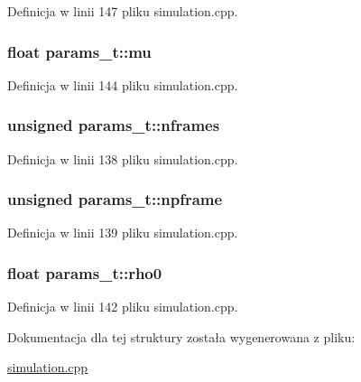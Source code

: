 Definicja w linii 147 pliku simulation.\-cpp.

\hypertarget{structparams__t_a971359c29b2f946b477e4a1b3605fa3f}{
\subsubsection[{mu}]{\setlength{\rightskip}{0pt plus 5cm}float params\-\_\-t\-::mu}}\label{structparams__t_a971359c29b2f946b477e4a1b3605fa3f}


Definicja w linii 144 pliku simulation.\-cpp.

\hypertarget{structparams__t_a2cecc28f4ca024657cf567047e2aba59}{
\subsubsection[{nframes}]{\setlength{\rightskip}{0pt plus 5cm}unsigned params\-\_\-t\-::nframes}}\label{structparams__t_a2cecc28f4ca024657cf567047e2aba59}


Definicja w linii 138 pliku simulation.\-cpp.

\hypertarget{structparams__t_a06a1a567fd5ba13905514227e2bb710a}{
\subsubsection[{npframe}]{\setlength{\rightskip}{0pt plus 5cm}unsigned params\-\_\-t\-::npframe}}\label{structparams__t_a06a1a567fd5ba13905514227e2bb710a}


Definicja w linii 139 pliku simulation.\-cpp.

\hypertarget{structparams__t_a2eb309edb681d0a998f23fc692a73781}{
\subsubsection[{rho0}]{\setlength{\rightskip}{0pt plus 5cm}float params\-\_\-t\-::rho0}}\label{structparams__t_a2eb309edb681d0a998f23fc692a73781}


Definicja w linii 142 pliku simulation.\-cpp.



Dokumentacja dla tej struktury została wygenerowana z pliku\-:\begin{DoxyCompactItemize}
\item 
\hyperlink{simulation_8cpp}{simulation.\-cpp}\end{DoxyCompactItemize}
